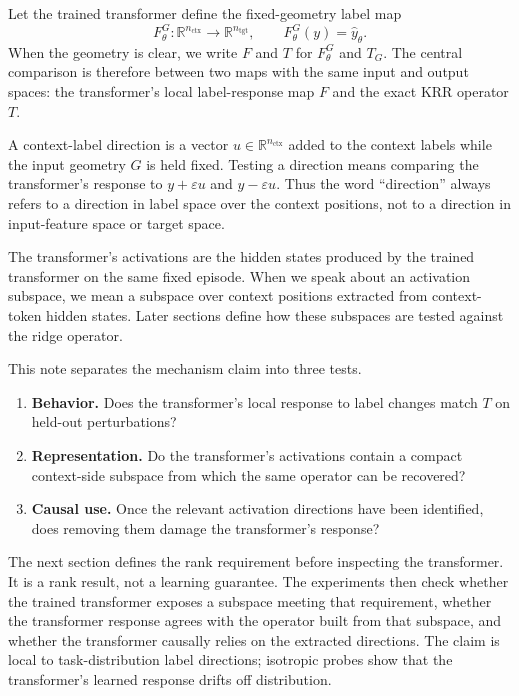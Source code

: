 \documentclass[11pt]{article}
\newcommand{\R}{\mathbb{R}}
\begin{document}
Let the trained transformer define the fixed-geometry label map
\[
F_\theta^G:\R^{n_{\mathrm{ctx}}}\to \R^{n_{\mathrm{tgt}}},\qquad
F_\theta^G(y)=\widehat{y}_\theta.
\]
When the geometry is clear, we write \(F\) and \(T\) for \(F_\theta^G\) and \(T_G\). The central
comparison is therefore between two maps with the same input and output spaces: the transformer's
local label-response map \(F\) and the exact KRR operator \(T\).

A context-label direction is a vector \(u\in \R^{n_{\mathrm{ctx}}}\) added to the context labels while
the input geometry \(G\) is held fixed. Testing a direction means comparing the transformer's
response to \(y+\varepsilon u\) and \(y-\varepsilon u\). Thus the word ``direction'' always refers to a
direction in label space over the context positions, not to a direction in input-feature space or
target space.

The transformer's activations are the hidden states produced by the trained transformer on the
same fixed episode. When we speak about an activation subspace, we mean a subspace over context
positions extracted from context-token hidden states. Later sections define how these subspaces
are tested against the ridge operator.

This note separates the mechanism claim into three tests.
\begin{enumerate}[label=\arabic*.]
\item \textbf{Behavior.} Does the transformer's local response to label changes match \(T\) on held-out perturbations?
\item \textbf{Representation.} Do the transformer's activations contain a compact context-side subspace from which the same operator can be recovered?
\item \textbf{Causal use.} Once the relevant activation directions have been identified, does removing them damage the transformer's response?
\end{enumerate}

The next section defines the rank requirement before inspecting the transformer. It is a rank
result, not a learning guarantee. The experiments then check whether the trained transformer
exposes a subspace meeting that requirement, whether the transformer response agrees with the
operator built from that subspace, and whether the transformer causally relies on the extracted
directions. The claim is local to task-distribution label directions; isotropic probes show that the
transformer's learned response drifts off distribution.
\end{document}
